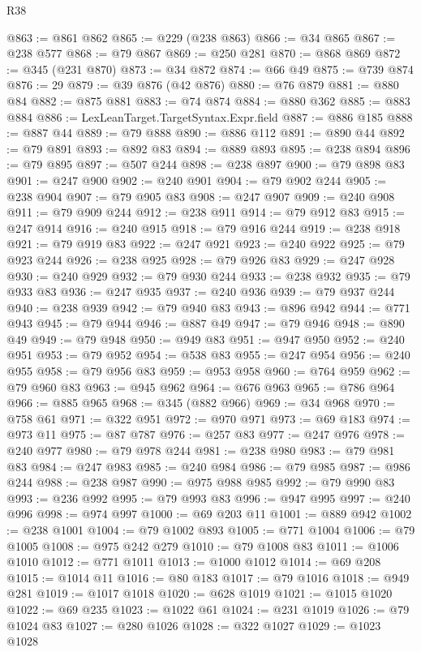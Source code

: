 \begin{lexlean}{R38}
\begin{coremodule}
@863 := @861 @862
@865 := @229 (@238 @863)
@866 := @34 @865
@867 := @238 @577
@868 := @79 @867
@869 := @250 @281
@870 := @868 @869
@872 := @345 (@231 @870)
@873 := @34 @872
@874 := @66 @49
@875 := @739 @874
@876 := 29
@879 := @39 @876 (@42 @876)
@880 := @76 @879
@881 := @880 @84
@882 := @875 @881
@883 := @74 @874
@884 := @880 @362
@885 := @883 @884
@886 := LexLeanTarget.TargetSyntax.Expr.field
@887 := @886 @185
@888 := @887 @44
@889 := @79 @888
@890 := @886 @112
@891 := @890 @44
@892 := @79 @891
@893 := @892 @83
@894 := @889 @893
@895 := @238 @894
@896 := @79 @895
@897 := @507 @244
@898 := @238 @897
@900 := @79 @898 @83
@901 := @247 @900
@902 := @240 @901
@904 := @79 @902 @244
@905 := @238 @904
@907 := @79 @905 @83
@908 := @247 @907
@909 := @240 @908
@911 := @79 @909 @244
@912 := @238 @911
@914 := @79 @912 @83
@915 := @247 @914
@916 := @240 @915
@918 := @79 @916 @244
@919 := @238 @918
@921 := @79 @919 @83
@922 := @247 @921
@923 := @240 @922
@925 := @79 @923 @244
@926 := @238 @925
@928 := @79 @926 @83
@929 := @247 @928
@930 := @240 @929
@932 := @79 @930 @244
@933 := @238 @932
@935 := @79 @933 @83
@936 := @247 @935
@937 := @240 @936
@939 := @79 @937 @244
@940 := @238 @939
@942 := @79 @940 @83
@943 := @896 @942
@944 := @771 @943
@945 := @79 @944
@946 := @887 @49
@947 := @79 @946
@948 := @890 @49
@949 := @79 @948
@950 := @949 @83
@951 := @947 @950
@952 := @240 @951
@953 := @79 @952
@954 := @538 @83
@955 := @247 @954
@956 := @240 @955
@958 := @79 @956 @83
@959 := @953 @958
@960 := @764 @959
@962 := @79 @960 @83
@963 := @945 @962
@964 := @676 @963
@965 := @786 @964
@966 := @885 @965
@968 := @345 (@882 @966)
@969 := @34 @968
@970 := @758 @61
@971 := @322 @951
@972 := @970 @971
@973 := @69 @183
@974 := @973 @11
@975 := @87 @787
@976 := @257 @83
@977 := @247 @976
@978 := @240 @977
@980 := @79 @978 @244
@981 := @238 @980
@983 := @79 @981 @83
@984 := @247 @983
@985 := @240 @984
@986 := @79 @985
@987 := @986 @244
@988 := @238 @987
@990 := @975 @988 @985
@992 := @79 @990 @83
@993 := @236 @992
@995 := @79 @993 @83
@996 := @947 @995
@997 := @240 @996
@998 := @974 @997
@1000 := @69 @203 @11
@1001 := @889 @942
@1002 := @238 @1001
@1004 := @79 @1002 @893
@1005 := @771 @1004
@1006 := @79 @1005
@1008 := @975 @242 @279
@1010 := @79 @1008 @83
@1011 := @1006 @1010
@1012 := @771 @1011
@1013 := @1000 @1012
@1014 := @69 @208
@1015 := @1014 @11
@1016 := @80 @183
@1017 := @79 @1016
@1018 := @949 @281
@1019 := @1017 @1018
@1020 := @628 @1019
@1021 := @1015 @1020
@1022 := @69 @235
@1023 := @1022 @61
@1024 := @231 @1019
@1026 := @79 @1024 @83
@1027 := @280 @1026
@1028 := @322 @1027
@1029 := @1023 @1028

\end{coremodule}
\end{lexlean}
